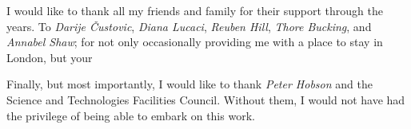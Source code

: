 \documentclass[11pt,a4paper]{report}
\begin{document}
I would like to thank all my friends and family for their support through the years.
To \textit{Darije \v{C}ustovi{c}}, \textit{Diana Lucaci}, \textit{Reuben Hill}, \textit{Thore Bucking}, and \textit{Annabel Shaw}; for not only occasionally providing me with a place to stay in London, but your 

Finally, but most importantly, I would like to thank \textit{Peter Hobson} and the Science and Technologies Facilities Council.
Without them, I would not have had the privilege of being able to embark on this work. 

\tableofcontents
\listoftables
\listoffigures



















\begin{appendices}
%

\end{appendices}



 
\end{document}
